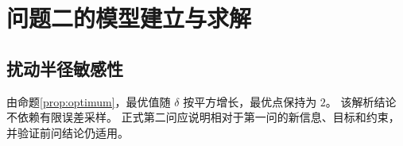 \section{问题二的模型建立与求解}
\subsection{扰动半径敏感性}
由命题\ref{prop:optimum}，最优值随 $\delta$ 按平方增长，最优点保持为 $2$。
该解析结论不依赖有限误差采样。
正式第二问应说明相对于第一问的新信息、目标和约束，并验证前问结论仍适用。
